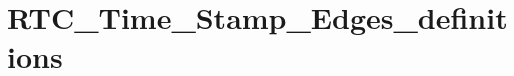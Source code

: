 \hypertarget{group___r_t_c___time___stamp___edges__definitions}{\section{R\-T\-C\-\_\-\-Time\-\_\-\-Stamp\-\_\-\-Edges\-\_\-definitions}
\label{group___r_t_c___time___stamp___edges__definitions}
}
